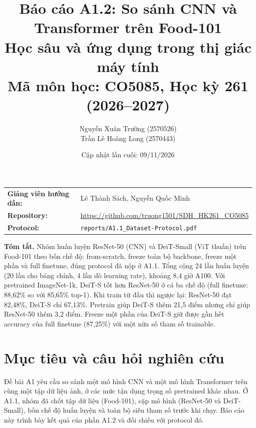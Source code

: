 \documentclass[12pt,a4paper]{article}
\title{\textbf{Báo cáo A1.2: So sánh CNN và Transformer trên Food-101}\\[0.3em]
\large Học sâu và ứng dụng trong thị giác máy tính\\
Mã môn học: CO5085, Học kỳ 261 (2026--2027)}
\author{
Nguyễn Xuân Trường (2570526) \\
Trần Lê Hoàng Long (2570443)
}
\date{Cập nhật lần cuối: 09/11/2026}
\begin{document}
\maketitle

\vspace{1cm}
\begin{center}
\begin{tabular}{ll}
\textbf{Giảng viên hướng dẫn:} & Lê Thành Sách, Nguyễn Quốc Minh \\
\textbf{Repository:} & \url{https://github.com/truong1501/SDH_HK261_CO5085} \\
\textbf{Protocol:} & \texttt{reports/A1.1\_Dataset-Protocol.pdf} \\
\end{tabular}
\end{center}

\vspace{0.5cm}
\begin{center}
\begin{minipage}{0.85\linewidth}
\textbf{Tóm tắt.} Nhóm huấn luyện ResNet-50 (CNN) và DeiT-Small (ViT thuần) trên
Food-101 theo bốn chế độ: from-scratch, freeze toàn bộ backbone, freeze một phần
và full finetune, đúng protocol đã nộp ở A1.1. Tổng cộng 24 lần huấn luyện (20 lần
cho bảng chính, 4 lần dò learning rate), khoảng 8,4 giờ A100. Với pretrained
ImageNet-1k, DeiT-S tốt hơn ResNet-50 ở cả ba chế độ (full finetune: 88,62\% so với
85,65\% top-1). Khi train từ đầu thì ngược lại: ResNet-50 đạt 82,48\%, DeiT-S chỉ
67,13\%. Pretrain giúp DeiT-S thêm 21,5 điểm nhưng chỉ giúp ResNet-50 thêm 3,2
điểm. Freeze một phần của DeiT-S giữ được gần hết accuracy của full finetune
(87,25\%) với một nửa số tham số trainable.
\end{minipage}
\end{center}

\clearpage
\tableofcontents
\clearpage

\section{Mục tiêu và câu hỏi nghiên cứu}

Đề bài A1 yêu cầu so sánh một mô hình CNN và một mô hình Transformer trên cùng một
tập dữ liệu ảnh, ở các mức tận dụng trọng số pretrained khác nhau. Ở A1.1, nhóm đã
chốt tập dữ liệu (Food-101), cặp mô hình (ResNet-50 và DeiT-Small), bốn chế độ
huấn luyện và toàn bộ siêu tham số trước khi chạy. Báo cáo này trình bày kết quả
của phần A1.2 và đối chiếu với protocol đó.
\end{document}
